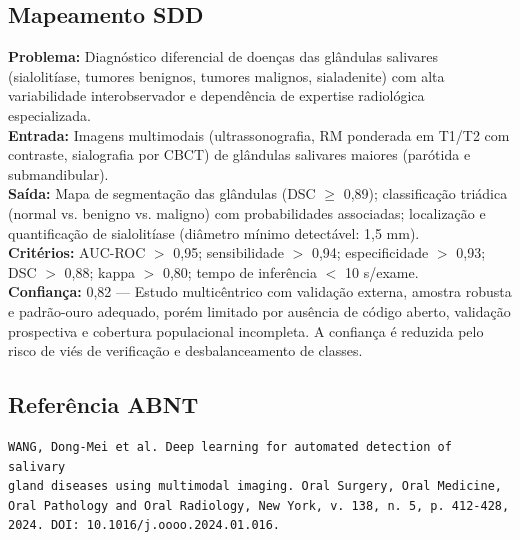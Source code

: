 \subsection{Mapeamento SDD}
\textbf{Problema:} Diagnóstico diferencial de doenças das glândulas
salivares (sialolitíase, tumores benignos, tumores malignos,
sialadenite) com alta variabilidade interobservador e dependência
de expertise radiológica especializada. \\
\textbf{Entrada:} Imagens multimodais (ultrassonografia, RM ponderada
em T1/T2 com contraste, sialografia por CBCT) de glândulas salivares
maiores (parótida e submandibular). \\
\textbf{Saída:} Mapa de segmentação das glândulas (DSC $\geq$ 0,89);
classificação triádica (normal vs. benigno vs. maligno) com
probabilidades associadas; localização e quantificação de sialolitíase
(diâmetro mínimo detectável: 1,5 mm). \\
\textbf{Critérios:} AUC-ROC $>$ 0,95; sensibilidade $>$ 0,94;
especificidade $>$ 0,93; DSC $>$ 0,88; kappa $>$ 0,80; tempo de
inferência $<$ 10 s/exame. \\
\textbf{Confiança:} 0,82 — Estudo multicêntrico com validação externa,
amostra robusta e padrão-ouro adequado, porém limitado por ausência
de código aberto, validação prospectiva e cobertura populacional
incompleta. A confiança é reduzida pelo risco de viés de verificação
e desbalanceamento de classes.

\subsection{Referência ABNT}
\begin{verbatim}
WANG, Dong-Mei et al. Deep learning for automated detection of salivary
gland diseases using multimodal imaging. Oral Surgery, Oral Medicine,
Oral Pathology and Oral Radiology, New York, v. 138, n. 5, p. 412-428,
2024. DOI: 10.1016/j.oooo.2024.01.016.
\end{verbatim}
\endinput
